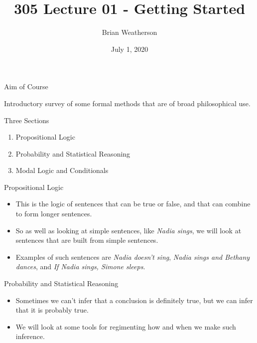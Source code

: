 \documentclass[
  ignorenonframetext,
]{beamer}
\title{305 Lecture 01 - Getting Started}
\author{Brian Weatherson}
\date{July 1, 2020}
\providecommand{\tightlist}{%
  \setlength{\itemsep}{0pt}\setlength{\parskip}{0pt}}
\renewcommand{\,}{\text{, }}
\begin{document}
\frame{\titlepage}

\begin{frame}{Aim of Course}
\protect\hypertarget{aim-of-course}{}

Introductory survey of some formal methods that are of broad
philosophical use.

\end{frame}

\begin{frame}{Three Sections}
\protect\hypertarget{three-sections}{}

\begin{enumerate}[<+->]
\tightlist
\item
  Propositional Logic
\item
  Probability and Statistical Reasoning
\item
  Modal Logic and Conditionals
\end{enumerate}

\end{frame}

\begin{frame}{Propositional Logic}
\protect\hypertarget{propositional-logic}{}

\begin{itemize}
\tightlist
\item
  This is the logic of sentences that can be true or false, and that can
  combine to form longer sentences.
\item
  So as well as looking at simple sentences, like \emph{Nadia sings}, we
  will look at sentences that are built from simple sentences.
\item
  Examples of such sentences are \emph{Nadia doesn't sing}, \emph{Nadia
  sings and Bethany dances}, and \emph{If Nadia sings, Simone sleeps}.
\end{itemize}

\end{frame}

\begin{frame}{Probability and Statistical Reasoning}
\protect\hypertarget{probability-and-statistical-reasoning}{}

\begin{itemize}[<+->]
\tightlist
\item
  Sometimes we can't infer that a conclusion is definitely true, but we
  can infer that it is probably true.
\item
  We will look at some tools for regimenting how and when we make such
  inference.
\end{itemize}

\end{frame}
\end{document}
